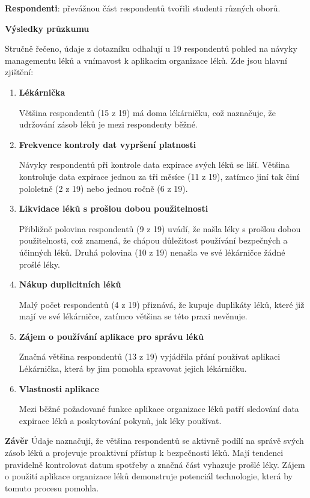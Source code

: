 \documentclass[a4paper, 11pt]{article}
\begin{document}
\textbf {Respondenti}: převážnou část respondentů tvořili studenti různých oborů.

\textbf {Výsledky průzkumu}

Stručně řečeno, údaje z dotazníku odhalují u 19 respondentů pohled na návyky managementu léků a vnímavost k aplikacím organizace léků. Zde jsou hlavní zjištění:

\begin{enumerate}
\item \textbf{Lékárnička}

Většina respondentů (15 z 19) má doma lékárničku, což naznačuje, že udržování zásob léků je mezi respondenty běžné.

\item \textbf {Frekvence kontroly dat vypršení platnosti}

Návyky respondentů při kontrole data expirace svých léků se liší. Většina kontroluje data expirace jednou za tři měsíce (11 z 19), zatímco jiní tak činí pololetně (2 z 19) nebo jednou ročně (6 z 19).

\item \textbf {Likvidace léků s prošlou dobou použitelnosti}

Přibližně polovina respondentů (9 z 19) uvádí, že našla léky s prošlou dobou použitelnosti, což znamená, že chápou důležitost používání bezpečných a účinných léků. Druhá polovina (10 z 19) nenašla ve své lékárničce žádné prošlé léky.

\item \textbf {Nákup duplicitních léků}

Malý počet respondentů (4 z 19) přiznává, že kupuje duplikáty léků, které již mají ve své lékárničce, zatímco většina se této praxi nevěnuje.

\item \textbf {Zájem o používání aplikace pro správu léků}

Značná většina respondentů (13 z 19) vyjádřila přání používat aplikaci Lékárnička, která by jim pomohla spravovat jejich lékárničku.

\item \textbf {Vlastnosti aplikace}

Mezi běžné požadované funkce aplikace organizace léků patří sledování data expirace léků a poskytování pokynů, jak léky používat.
\end{enumerate}

\textbf {Závěr}
Údaje naznačují, že většina respondentů se aktivně podílí na správě svých zásob léků a projevuje proaktivní přístup k bezpečnosti léků. Mají tendenci pravidelně kontrolovat datum spotřeby a značná část vyhazuje prošlé léky. Zájem o použití aplikace organizace léků demonstruje potenciál technologie, která by tomuto procesu pomohla.
\end{document}
